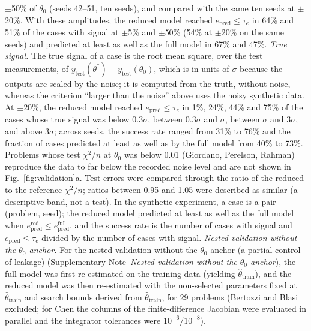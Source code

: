 \documentclass[pdflatex,sn-nature]{sn-jnl}
\theoremstyle{plain}
\begin{document}
$\pm$50\% of $\theta_0$ (seeds 42--51, ten seeds), and compared with the same ten seeds at $\pm$20\%. With these amplitudes, the reduced model reached $e_{\mathrm{pred}}\le\tau_e$ in 64\% and 51\% of the cases with signal at $\pm$5\% and $\pm$50\% (54\% at $\pm$20\% on the same seeds) and predicted at least as well as the full model in 67\% and 47\%. \label{met:val-signal}\emph{True signal.} The true signal of a case is the root mean square, over the test measurements, of $y_{\mathrm{test}}(\theta^\ast)-y_{\mathrm{test}}(\theta_0)$, which is in units of $\sigma$ because the outputs are scaled by the noise; it is computed from the truth, without noise, whereas the criterion ``larger than the noise'' above uses the noisy synthetic data. At $\pm$20\%, the reduced model reached $e_{\mathrm{pred}}\le\tau_e$ in 1\%, 24\%, 44\% and 75\% of the cases whose true signal was below $0.3\sigma$, between $0.3\sigma$ and $\sigma$, between $\sigma$ and $3\sigma$, and above $3\sigma$; across seeds, the success rate ranged from 31\% to 76\% and the fraction of cases predicted at least as well as by the full model from 40\% to 73\%. Problems whose test $\chi^2/n$ at $\theta_0$ was below 0.01 (Giordano, Perelson, Rahman) reproduce the data to far below the recorded noise level and are not shown in Fig.~\ref{fig:validation}a. Test errors were compared through the ratio of the reduced to the reference $\chi^2/n$; ratios between 0.95 and 1.05 were described as similar (a descriptive band, not a test). In the synthetic experiment, a case is a pair (problem, seed); the reduced model predicted at least as well as the full model when $e^{\mathrm{red}}_{\mathrm{pred}}\le e^{\mathrm{full}}_{\mathrm{pred}}$, and the success rate is the number of cases with signal and $e_{\mathrm{pred}}\le\tau_e$ divided by the number of cases with signal. \label{met:val-nested}\emph{Nested validation without the $\theta_0$ anchor.} For the nested validation without the $\theta_0$ anchor (a partial control of leakage) (Supplementary Note~\textit{Nested validation without the $\theta_0$ anchor}), the full model was first re-estimated on the training data (yielding $\hat\theta_{\mathrm{train}}$), and the reduced model was then re-estimated with the non-selected parameters fixed at $\hat\theta_{\mathrm{train}}$ and search bounds derived from $\hat\theta_{\mathrm{train}}$, for 29 problems (Bertozzi and Blasi excluded; for Chen the columns of the finite-difference Jacobian were evaluated in parallel and the integrator tolerances were $10^{-6}/10^{-8}$).
\end{document}
